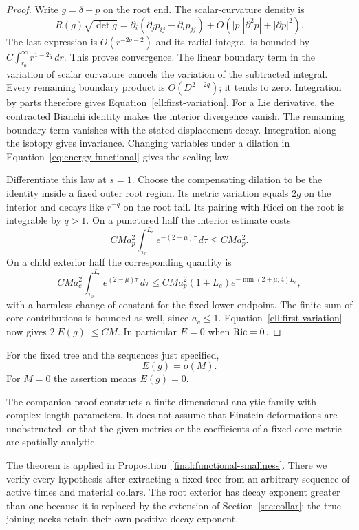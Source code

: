 \begin{proof}
Write $g=\delta+p$ on the root end.  The scalar-curvature density is
\[
 R(g)\sqrt{\det g}=
 \partial_i(\partial_jp_{ij}-\partial_ip_{jj})+
 O(|p||\partial^2p|+|\partial p|^2).
\]
The last expression is $O(r^{-2q-2})$ and its radial integral is
bounded by $C\int_{r_0}^\infty r^{1-2q}\,dr$.  This proves convergence.
The linear boundary term in the variation of scalar curvature
cancels the variation of the subtracted integral.  Every remaining
boundary product is $O(D^{2-2q})$; it tends to zero.  Integration by
parts therefore gives Equation~\eqref{ell:first-variation}.
For a Lie derivative, the contracted Bianchi identity makes the
interior divergence vanish.  The remaining boundary term vanishes
with the stated displacement decay.  Integration along the isotopy
gives invariance.  Changing variables under a dilation in
Equation~\eqref{eq:energy-functional} gives the scaling law.

Differentiate this law at $s=1$.  Choose the compensating dilation
to be the identity inside a fixed outer root region.  Its metric
variation equals $2g$ on the interior and decays like $r^{-q}$ on
the root tail.  Its pairing with Ricci on the root is integrable
by $q>1$.  On a punctured half the interior estimate costs
\[
 CM a_p^2\int_{\tau_0}^{L_e}e^{-(2+\mu)\tau}\,d\tau\le CM a_p^2.
\]
On a child exterior half the corresponding quantity is
\[
 CM a_c^2\int_{\tau_0}^{L_e}e^{(2-\mu)\tau}\,d\tau
 \le CM a_p^2(1+L_e)e^{-\min(2+\mu,4)L_e},
\]
with a harmless change of constant for the fixed lower endpoint.
The finite sum of core contributions is bounded as well, since
$a_v\le1$.  Equation~\eqref{ell:first-variation} now gives
$2|E(g)|\le CM$.  In particular $E=0$ when $\operatorname{Ric}=0$.
\end{proof}

\begin{theorem}
\label{thm:tree-inequality}
For the fixed tree and the sequences just specified,
\begin{equation}
                         E(g)=o(M).
 \label{ell:little-oh}
\end{equation}
For $M=0$ the assertion means $E(g)=0$.
\end{theorem}

The companion proof constructs a finite-dimensional analytic family with
complex length parameters.  It does not assume that Einstein
deformations are unobstructed, or that the given metrics or the
coefficients of a fixed core metric are spatially analytic.

The theorem is applied in Proposition~\ref{final:functional-smallness}.
There we verify every hypothesis after extracting a fixed tree from an
arbitrary sequence of active times and material collars. The root
exterior has decay exponent greater than one because it is replaced
by the extension of Section~\ref{sec:collar}; the true joining necks
retain their own positive decay exponent.

